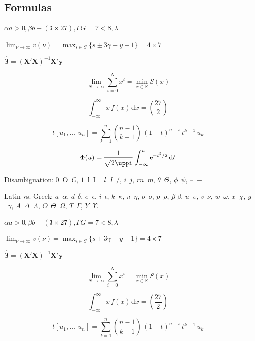 \documentclass[11pt, a4paper, oneside]{article}
\newcommand{\mathup}[1]{\mathrm{#1}}
\newcommand{\dd}{\mathrm{d}}
\newcommand*{\divslash}{%
	\mathbin{%
		\nonscript\mskip-2mu / \nonscript\mskip-2mu%
	}%
}  %
\theoremstyle{Plain}
\theoremstyle{Definition}
\theoremstyle{Remark}
\begin{document}
\begin{appendix}
	\subsection{Formulas \showfamily}

	\setlength{\parindent}{0pt}

	\noindent%
	\checkgreekletters

	\noindent%
	{\boldmath\checkgreekletters}

	\noindent%
	{\checkgreeklettersup}

	\noindent%
	{\boldmath \checkgreeklettersup}

	\noindent%
	$\alpha a > 0, \beta b + (3 \times 27), \Gamma G = 7 < 8, \lambda$

	$\lim_{\nu \to \infty} v(\nu) = \max_{s \in S} \{s \pm 3 \gamma + y - 1\} = 4 \times 7$

	$\hat{\bm{\beta}} = (\bm{X}'\bm{X})^{-1}\bm{X}'\bm{y}$

	$$\lim_{N \to \infty} \sum_{i=0}^{N} x^i = \min_{x \in \mathbb{R}} S(x)$$

	$$\int_{-\infty}^{\infty} x\,f(x)\,\mathup{d}x = \left( \frac{27}{2} \right)$$

	$$t[u_1, \dots, u_n] = \sum_{k=1}^n \binom{n - 1}{k - 1} \, (1 - t)^{n-k} \, t^{k-1} \, u_k$$

	$$\Phi(u) = \frac{1}{\sqrt{2\uppi}} \int_{-\infty}^u \mathrm{e}^{-t^2 \divslash 2} \, \dd t$$

	Disambiguation: $0$~O~$O$, $1$~l~I~$|$~$l$~$I$~$/$, $i$~$j$, $rn$~$m$, $\theta$~$\Theta$, $\phi$~$\psi$, --~$-$

	Latin vs. Greek: $a$~$\alpha$, $d$~$\delta$, $e$~$\epsilon$, $i$~$\iota$, $k$~$\kappa$, $n$~$\eta$, $o$~$\sigma$, $p$~$\rho$, \textit{\ss} $\beta$, $u$~$\upsilon$, $v$~$\nu$, $w$~$\omega$, $x$~$\chi$, $y$~$\gamma$, $A$~$\Delta$~$\Lambda$, $O$~$\Theta$~$\Omega$, $T$~$\Gamma$, $Y$~$\Upsilon$.

	\noindent%
	{\bfseries\boldmath%
		$\alpha a > 0, \beta b + (3 \times 27), \Gamma G = 7 < 8, \lambda$

		$\lim_{\nu \to \infty} v(\nu) = \max_{s \in S} \{s \pm 3 \gamma + y - 1\} = 4 \times 7$

		$\hat{\bm{\beta}} = (\bm{X}'\bm{X})^{-1}\bm{X}'\bm{y}$

		$$\lim_{N \to \infty} \sum_{i=0}^{N} x^i = \min_{x \in \mathbb{R}} S(x)$$

		$$\int_{-\infty}^{\infty} x\,f(x)\,\mathup{d}x = \left( \frac{27}{2} \right)$$

		$$t[u_1, \dots, u_n] = \sum_{k=1}^n \binom{n - 1}{k - 1} \, (1 - t)^{n-k} \, t^{k-1} \, u_k$$

}
\end{appendix}
\end{document}
